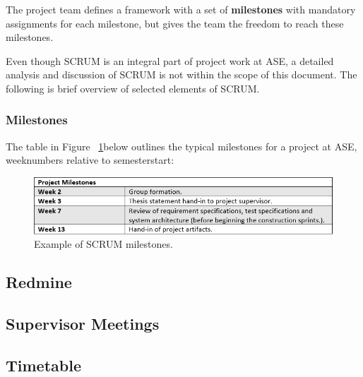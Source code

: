 The project team defines a framework with a set of \textbf{milestones} with mandatory assignments for each milestone, but gives the team the freedom to reach these milestones. \newline

Even though SCRUM is an integral part of project work at ASE, a detailed analysis and discussion of SCRUM is not within the scope of this document. The following is brief overview of selected elements of SCRUM. \newline

\subsubsection{Milestones}
The table in Figure ~\ref{fig:milestonespng}below outlines the typical milestones for a project at ASE, weeknumbers relative to semesterstart:

\begin{figure}[H]
\centering
\includegraphics[scale=0.8]{./pictures/milestones.png}
\caption{Example of SCRUM milestones.}
\label{fig:milestonespng}
\end{figure}

\subsection{Redmine}


\subsection{Supervisor Meetings}


\subsection{Timetable}




